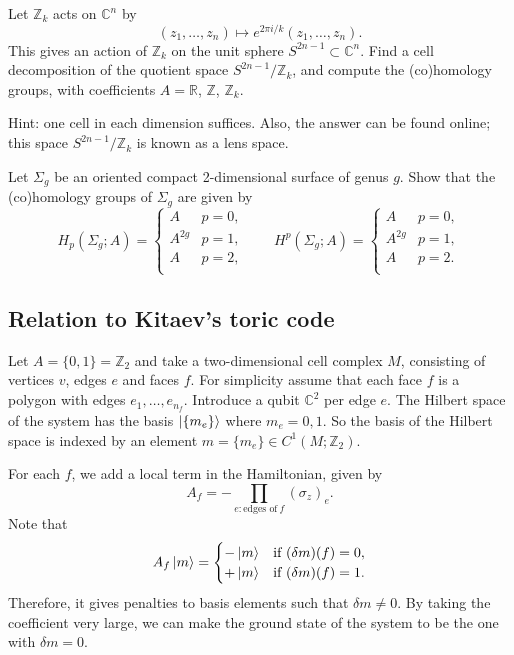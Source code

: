 \documentclass[12pt]{article}
\numberwithin{equation}{section}
\numberwithin{figure}{section}
\theoremstyle{remark}
\def\bC{\mathbb{C}}
\def\bR{\mathbb{R}}
\def\bZ{\mathbb{Z}}
\begin{document}
\begin{question}
Let $\bZ_k$ acts on $\bC^n$ by \begin{equation}
   (z_1,\ldots,z_n) \mapsto e^{2\pi i/k}(z_1,\ldots,z_n).
\end{equation} 
This gives an action of $\bZ_k$ on the unit sphere $S^{2n-1}\subset \bC^n$.
Find a cell decomposition of the quotient space $S^{2n-1}/\bZ_k$,
and compute the (co)homology groups, with coefficients $A=\bR$, $\bZ$, $\bZ_k$.
\end{question}
Hint: one cell in each dimension suffices. 
Also, the answer can be found online; this space $S^{2n-1}/\bZ_k$ is known as a lens space.

\begin{question}
Let $\Sigma_g$ be an oriented compact 2-dimensional surface of genus $g$.
Show that the (co)homology groups of $\Sigma_g$ are given by \begin{equation}
H_p(\Sigma_g;A) = \begin{cases} 
  A & p=0, \\ 
  A^{2g} & p=1, \\
  A & p=2, \\
\end{cases}\qquad
H^p(\Sigma_g;A) =\begin{cases} 
  A & p=0, \\ 
  A^{2g} & p=1, \\
  A & p=2. \\
\end{cases}
\end{equation}
\end{question}

\subsection{Relation to Kitaev's toric code}

Let $A=\{0,1\}=\bZ_2$ and take a two-dimensional cell complex $M$,
consisting of vertices $v$, edges $e$ and faces $f$.
For simplicity assume that each face $f$ is a polygon with edges $e_1,\ldots,e_{n_f}$.
Introduce a qubit $\bC^2$ per edge $e$.
The Hilbert space of the system has the basis $\ket{\{m_e\}}$ where $m_e=0,1$.
So the basis of the Hilbert space is indexed by an element $m=\{m_e\}\in C^1(M;\bZ_2)$.

For each $f$, we add a local term in the Hamiltonian, 
given by 
\begin{equation}
  A_f=-\prod_{e: \text{edges of}\ f} (\sigma_z)_e.
\end{equation}
Note that 
\begin{equation}
A_f \ket{m} = \begin{cases}
  -\ket{m} & \text{if}\ (\delta m)(f)=0,\\
  +\ket{m} & \text{if}\ (\delta m)(f)=1.
\end{cases}
\end{equation}
Therefore, it gives penalties to basis elements such that $\delta m\neq 0$.
By taking the coefficient very large, we can make the ground state of the system to be the one with $\delta m=0$.
\end{document}
